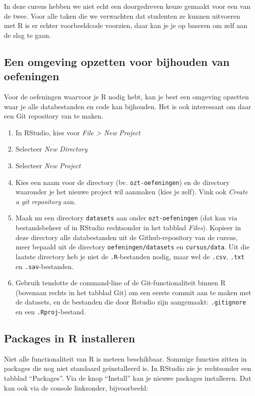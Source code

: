In deze cursus hebben we niet echt een doorgedreven keuze gemaakt voor een van de twee. Voor alle taken die we verwachten dat studenten ze kunnen uitvoeren met R is er echter voorbeeldcode voorzien, daar kan je je op baseren om zelf aan de slag te gaan.

\subsection{Een omgeving opzetten voor bijhouden van oefeningen}

Voor de oefeningen waarvoor je R nodig hebt, kan je best een omgeving opzetten waar je alle databestanden en code kan bijhouden. Het is ook interessant om daar een Git repository van te maken.

\begin{enumerate}
  \item In RStudio, kies voor \textit{File > New Project}
  \item Selecteer \textit{New Directory}
  \item Selecteer \textit{New Project}
  \item Kies een naam voor de directory (bv. \texttt{ozt-oefeningen}) en de directory waaronder je het nieuwe project wil aanmaken (kies je zelf). Vink ook \textit{Create a git repository} aan.
  \item Maak nu een directory \texttt{datasets} aan onder \texttt{ozt-oefeningen} (dat kan via bestandsbeheer of in RStudio rechtsonder in het tabblad \textit{Files}). Kopieer in deze directory alle databestanden uit de Github-repository van de cursus, meer bepaald uit de directory \texttt{oefeningen/datasets} en \texttt{cursus/data}. Uit die laatste directory heb je niet de \texttt{.R}-bestanden nodig, maar wel de \texttt{.csv}, \texttt{.txt} en \texttt{.sav}-bestanden.
  \item Gebruik tenslotte de command-line of de Git-functionaliteit binnen R (bovenaan rechts in het tabblad Git) om een eerste commit aan te maken met de datasets, en de bestanden die door Rstudio zijn aangemaakt: \texttt{.gitignore} en een \texttt{.Rproj}-bestand.
\end{enumerate}

\subsection{Packages in R installeren}

Niet alle functionaliteit van R is meteen beschikbaar. Sommige functies zitten in packages die nog niet standaard geïnstalleerd is. In RStudio zie je rechtsonder een tabblad ``Packages''. Via de knop ``Install'' kan je nieuwe packages installeren. Dat kan ook via de console linksonder, bijvoorbeeld:

